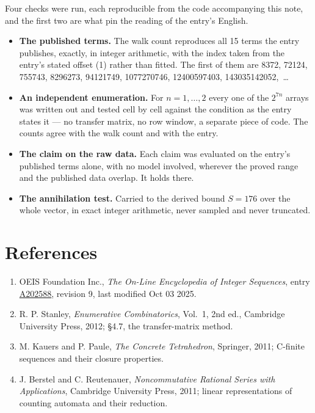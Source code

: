 \documentclass[11pt]{article}
\theoremstyle{definition}
\begin{document}
Four checks were run, each reproducible from the code accompanying this note, and the first two are what pin the reading of the entry's English.

\begin{itemize}

\item {\bfseries The published terms.} The walk count reproduces all 15 terms the entry publishes, exactly, in integer arithmetic, with the index taken from the entry's stated offset (1) rather than fitted. The first of them are 8372, 72124, 755743, 8296273, 94121749, 1077270746, 12400597403, 143035142052,~\dots

\item {\bfseries An independent enumeration.} For $n = 1,\dots,2$ every one of the $2^{7n}$ arrays was written out and tested cell by cell against the condition as the entry states it --- no transfer matrix, no row window, a separate piece of code. The counts agree with the walk count and with the entry.

\item {\bfseries The claim on the raw data.} Each claim was evaluated on the entry's published terms alone, with no model involved, wherever the proved range and the published data overlap. It holds there.

\item {\bfseries The annihilation test.} Carried to the derived bound $S = 176$ over the whole vector, in exact integer arithmetic, never sampled and never truncated.

\end{itemize}

\section{References}

\begin{enumerate}

\item OEIS Foundation Inc., \emph{The On-Line Encyclopedia of Integer Sequences}, entry \href{https://oeis.org/A202588}{A202588}, revision 9, last modified Oct 03 2025.

\item R. P. Stanley, \emph{Enumerative Combinatorics}, Vol.~1, 2nd ed., Cambridge University Press, 2012; \S4.7, the transfer-matrix method.

\item M. Kauers and P. Paule, \emph{The Concrete Tetrahedron}, Springer, 2011; C-finite sequences and their closure properties.

\item J. Berstel and C. Reutenauer, \emph{Noncommutative Rational Series with Applications}, Cambridge University Press, 2011; linear representations of counting automata and their reduction.

\end{enumerate}
\end{document}
